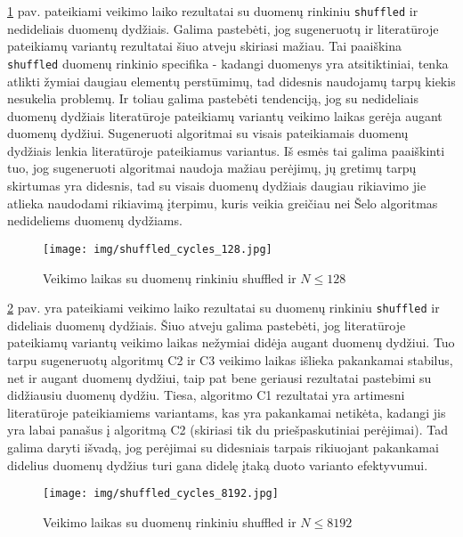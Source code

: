 \documentclass{VUMIFInfBakalaurinis}
\begin{document}
\ref{img:shuffled_cycles_128} pav. pateikiami veikimo laiko rezultatai su duomenų rinkiniu \verb|shuffled| ir nedideliais duomenų dydžiais.
Galima pastebėti, jog sugeneruotų ir literatūroje pateikiamų variantų rezultatai šiuo atveju skiriasi mažiau.
Tai paaiškina \verb|shuffled| duomenų rinkinio specifika - kadangi duomenys yra atsitiktiniai, tenka atlikti žymiai daugiau elementų perstūmimų,
tad didesnis naudojamų tarpų kiekis nesukelia problemų. 
Ir toliau galima pastebėti tendenciją, jog su nedideliais duomenų dydžiais literatūroje pateikiamų variantų veikimo laikas gerėja augant duomenų dydžiui.
Sugeneruoti algoritmai su visais pateikiamais duomenų dydžiais lenkia literatūroje pateikiamus variantus.
Iš esmės tai galima paaiškinti tuo, jog sugeneruoti algoritmai naudoja mažiau perėjimų, jų gretimų tarpų skirtumas yra didesnis,
tad su visais duomenų dydžiais daugiau rikiavimo jie atlieka naudodami rikiavimą įterpimu, kuris veikia
greičiau nei Šelo algoritmas nedideliems duomenų dydžiams. %

\begin{figure}[H]
  \centering
  \texttt{[image: img/shuffled\_cycles\_128.jpg]}
  \caption{Veikimo laikas su duomenų rinkiniu shuffled ir $N \leq 128$}
  \label{img:shuffled_cycles_128}
\end{figure}

\ref{img:shuffled_cycles_8192} pav. yra pateikiami veikimo laiko rezultatai su duomenų rinkiniu \verb|shuffled| ir dideliais duomenų dydžiais.
Šiuo atveju galima pastebėti, jog literatūroje pateikiamų variantų veikimo laikas nežymiai didėja augant duomenų dydžiui.
Tuo tarpu sugeneruotų algoritmų C2 ir C3 veikimo laikas išlieka pakankamai stabilus, net ir augant duomenų dydžiui, taip pat
bene geriausi rezultatai pastebimi su didžiausiu duomenų dydžiu.
Tiesa, algoritmo C1 rezultatai yra artimesni literatūroje pateikiamiems variantams,
kas yra pakankamai netikėta, kadangi jis yra labai panašus į algoritmą C2 (skiriasi tik du priešpaskutiniai perėjimai).
Tad galima daryti išvadą, jog perėjimai su didesniais tarpais rikiuojant pakankamai didelius duomenų dydžius turi gana didelę įtaką duoto varianto efektyvumui.

\begin{figure}[H]
  \centering
  \texttt{[image: img/shuffled\_cycles\_8192.jpg]}
  \caption{Veikimo laikas su duomenų rinkiniu shuffled ir $N \leq 8192$}
  \label{img:shuffled_cycles_8192}
\end{figure}

\pagebreak
\end{document}
